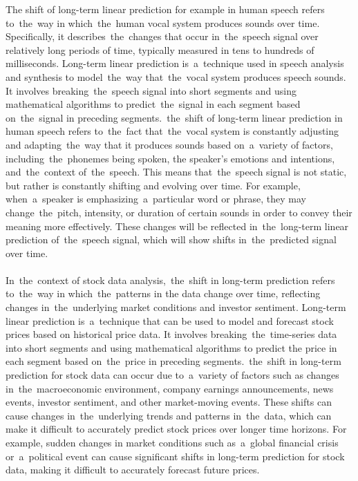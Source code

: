 The shift of long-term linear prediction for example in human speech refers to~the~way in which~the~human vocal system produces sounds over time.
Specifically, it describes~the~changes that occur in~the~speech signal over relatively long periods of time, typically
measured in tens to hundreds of milliseconds. Long-term linear prediction is~a~technique used in speech analysis and
synthesis to model~the~way that~the~vocal system produces speech sounds. It involves breaking~the~speech signal into
short segments and using mathematical algorithms to predict~the~signal in each segment based on~the~signal in preceding
segments.~the~shift of long-term linear prediction in human speech refers to~the~fact that~the~vocal system is constantly
adjusting and adapting~the~way that it produces sounds based on~a~variety of factors, including~the~phonemes being spoken,
the speaker's emotions and intentions, and~the~context of~the~speech. This means that~the~speech signal is not static,
but rather is constantly shifting and evolving over time. For example, when~a~speaker is emphasizing~a~particular
word or phrase, they may change~the~pitch, intensity, or duration of certain sounds in order to convey their meaning
more effectively. These changes will be reflected in~the~long-term linear prediction of~the~speech signal, which will
show shifts in~the~predicted signal over time.\\
\\
In~the~context of stock data analysis,~the~shift in long-term prediction refers to~the~way in which~the~patterns in
the data change over time, reflecting changes in~the~underlying market conditions and investor sentiment.
Long-term linear prediction is~a~technique that can be used to model and forecast stock prices based on historical
price data. It involves breaking~the~time-series data into short segments and using mathematical algorithms to predict
the price in each segment based on~the~price in preceding segments.~the~shift in long-term prediction for stock data
can occur due to~a~variety of factors such as changes in~the~macroeconomic environment, company earnings announcements,
news events, investor sentiment, and other market-moving events. These shifts can cause changes in~the~underlying trends
and patterns in~the~data, which can make it difficult to accurately predict stock prices over longer time horizons.
For example, sudden changes in market conditions such as~a~global financial crisis or~a~political event can cause
significant shifts in long-term prediction for stock data, making it difficult to accurately forecast future prices.
